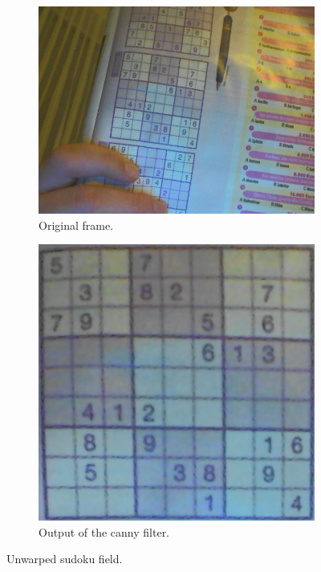 \documentclass[
a4paper,     %
12pt         %
]{scrartcl}  %
\begin{document}
\begin{figure}
    \centering
    \begin{subfigure}[b]{0.70\textwidth}
        \centering
        \includegraphics[width=\textwidth]{imgs/unwarp_frame.png}
        \caption{Original frame.}
    \end{subfigure}

    \begin{subfigure}[b]{0.70\textwidth}
        \centering
        \includegraphics[width=\textwidth]{imgs/unwarp.png}
        \caption{Output of the canny filter.}
    \end{subfigure}
    \caption{Unwarped sudoku field.}
    \label{fig:unwarping}
\end{figure}
\end{document}
